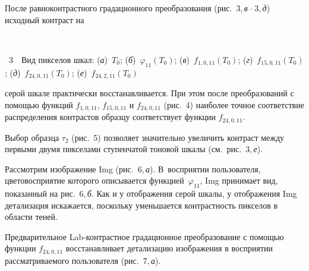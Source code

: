 \begin{multicols}{2}
  После равноконтрастного градационного преобразования (рис.~3,\,\textit{в}\,--\,3,\,\textit{д}) 
  исходный контраст на\linebreak\vspace*{-12pt}



\noindent
\begin{center}  %
\vspace*{-18pt}
\mbox{%
 \epsfxsize=68.608mm
 }
  \end{center}

  \vspace*{-3pt}

\noindent
{{\figurename~3}\ \ \small{Вид пикселов шкал: (\textit{а})~$T_0$; (\textit{б})~$\varphi_{11}(T_0)$; 
(\textit{в})~$f_{1,0,11}(T_0)$; (\textit{г})~$f_{15,0,11}(T_0)$; (\textit{д})~$f_{24,0,11}(T_0)$; 
(\textit{е})~$f_{24,2,11}(T_0)$}}

\vspace*{18pt}


\noindent 
 серой шкале практически 
восстанавливается. При
 этом после преобразований с помощью функций $f_{1,0,11}$, $f_{15,0,11}$ и $f_{24,0,11}$ (рис.~4) 
наиболее точное соответствие распределения контрастов образцу 
соответствует функции $f_{24,0,11}$.
  
  Выбор образца $\tau_2$ (рис.~5) позволяет значительно увеличить 
контраст между первыми двумя пикселами ступенчатой тоновой шкалы 
(см.\ рис.~3,\,\textit{е}).

  



  Рассмотрим изображение Img (рис.~6,\,\textit{а}). В~восприятии 
пользователя, цветовосприятие которого описывается функцией~$\varphi_{11}$, 
Img принимает вид, показанный на рис.~6,\,\textit{б}. Как и у 
отображения серой шкалы, у отображения Img детализация искажается, 
поскольку уменьшается контрастность пикселов в области теней. 

  Предварительное Lab-конт\-раст\-ное градационное преобразование с 
помощью функции $f_{24,0,11}$ восстанавливает детализацию изображения в 
восприятии рассматриваемого пользователя (рис.~7,\,\textit{а}). 

\begin{center}  %
\mbox{%
 \epsfxsize=43.389mm
 }
  \end{center}


\end{multicols}
